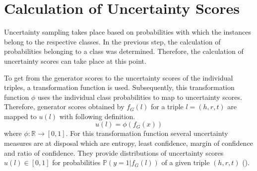 \section{Calculation of Uncertainty Scores}
\label{sec:calculation_of_uncertainty_scores}
%
Uncertainty sampling takes place based on probabilities with which the instances belong to the respective classes.
In the previous step, the calculation of probabilities belonging to a class was determined.
Therefore, the calculation of uncertainty scores can take place at this point.

To get from the generator scores to the uncertainty scores of the individual triples, a transformation function is used.
Subsequently, this transformation function $\phi$ uses the individual class probabilities to map to uncertainty scores.
Therefore, generator scores obtained by $f_G(l)$ for a triple $l = (h,r,t)$ are  mapped to $u(l)$ with following definition.
\begin{equation} \label{eqn:uncertainty_function}
    u(l) = \phi(f_G(x))
\end{equation}
where $\phi: \mathbb{R} \rightarrow [0,1]$.
For this transformation function several uncertainty measures are at disposal which are entropy, least confidence, margin of confidence and ratio of confidence.
They provide distributions of uncertainty scores $u(l) \in [0, 1]$ for probabilities $\mathbb{P}(y = 1 | f_G(l))$ of a given triple $(h, r, t)$ ().
\clearpage
